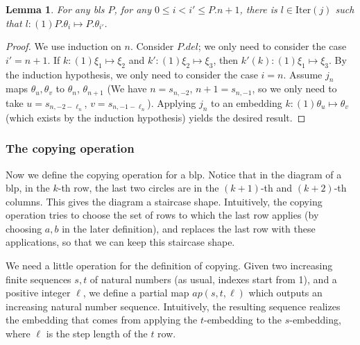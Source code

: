 \documentclass{article}
\newtheorem{lemma}{Lemma}[section]
\theoremstyle{definition}
\theoremstyle{remark}
\begin{document}
\begin{lemma} \label{lem:moving_any_theta_i_to_theta_j}
  For any bls $P$, for any $0\le i<i'\le P.n+1$, there is $l\in \mathrm{Iter}(j)$ such that $l:(1)P.\theta_i \mapsto P.\theta_{i'}$.
\end{lemma}

\begin{proof}
  We use induction on $n$. Consider $P.del$; we only need to consider the case $i'=n+1$. If $k:(1)\xi_1\mapsto\xi_2$ and $k':(1)\xi_2\mapsto\xi_3$, then $k'(k):(1)\xi_1\mapsto\xi_3$. By the induction hypothesis, we only need to consider the case $i=n$. Assume $j_{n}$ maps $\theta_u,\theta_v$ to  $\theta_n$, $\theta_{n+1}$ (We have $n=s_{n,-2}$, $n+1=s_{n,-1}$, so we only need to take $u=s_{n,-2-\ell_n}$, $v=s_{n,-1-\ell_n}$). Applying $j_{n}$ to an embedding $k:(1)\theta_{u}\mapsto\theta_{v}$ (which exists by the induction hypothesis) yields the desired result.
\end{proof}



\subsubsection*{The copying operation}

Now we define the copying operation for a blp. Notice that in the diagram of a blp, in the $k$-th row, the last two circles are in the $(k+1)$-th and $(k+2)$-th columns. This gives the diagram a staircase shape. Intuitively, the copying operation tries to choose the set of rows to which the last row applies (by choosing $a,b$ in the later definition), and replaces the last row with these applications, so that we can keep this staircase shape. %

We need a little operation for the definition of copying. Given two increasing finite sequences $s,t$ of natural numbers (as usual, indexes start from 1), and a positive integer $\ell$, we define a partial map $ap(s,t,\ell)$ which outputs an increasing natural number sequence. Intuitively, the resulting sequence realizes the embedding that comes from applying the $t$-embedding to the $s$-embedding, where $\ell$ is the step length of the $t$ row. 
\end{document}
